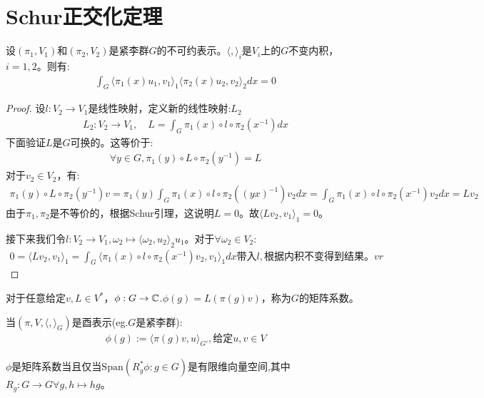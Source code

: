 \section{Schur正交化定理}
\begin{theorem}
    设$(\pi_1,V_1)$和$(\pi_2,V_2)$是紧李群$G$的不可约表示。$\langle,\rangle_i$是$V_i$上的$G$不变内积，$i=1,2$。则有:
    \begin{align*}
        \int_G \langle \pi_1(x)u_1,v_1\rangle_1\langle \pi_2(x)u_2,v_2\rangle_2 dx=0
    \end{align*}
\end{theorem}
\begin{proof}
    设$l:V_2 \to V_1$是线性映射，定义新的线性映射:$L_2$
    \begin{align*}
        L_2:V_2 \to V_1,\quad L=\int_G \pi_1(x)\circ l \circ \pi_2(x^{-1})dx
    \end{align*}
    下面验证$L$是$G$可换的。这等价于:
    \begin{align*}
        \forall y\in G,\pi_1(y)\circ L \circ \pi_2(y^{-1})=L
    \end{align*}
    对于$v_2 \in V_2$，有:
    \begin{align*}
        \pi_1(y) \circ L \circ \pi_2(y^{-1})v=\pi_1(y)\int_G \pi_1(x) \circ l \circ \pi_2((yx)^{-1})v_2 dx=\int_G \pi_1(x) \circ l\circ \pi_2(x^{-1})v_2dx=Lv_2
    \end{align*}
    由于$\pi_1,\pi_2$是不等价的，根据Schur引理，这说明$L=0$。故$\langle Lv_2,v_1\rangle_1=0$。

    接下来我们令$l:V_2 \to V_1, \omega_2 \mapsto \langle \omega_2,u_2\rangle_2 u_1$。对于$\forall \omega_2 \in V_2$:
    \begin{align*}
        0=\langle Lv_2,v_1\rangle_1=\int_G \langle \pi_1(x)\circ l\circ \pi_2(x^{-1})v_2,v_1 \rangle_1 dx \text{带入}l,\text{根据内积不变得到结果。} vr
    \end{align*}
\end{proof}
\begin{definition}
    对于任意给定$v,L \in V^*$，$\phi:G \to \mathbb{C}$.$\phi(g)=L(\pi(g)v)$，称为$G$的矩阵系数。
\end{definition}
\begin{remark}
    当$(\pi,V,\langle,\rangle_G)$是酉表示(eg.$G$是紧李群):
    \begin{align*}
        \phi(g):=\langle \pi(g)v,u\rangle_{G'},\text{给定}u,v \in V
    \end{align*}
\end{remark}
\begin{theorem}
    $\phi$是矩阵系数当且仅当$\mathrm{Span}(R_g^*\phi:g \in G)$是有限维向量空间,其中$R_g: G \to G \forall g,h  \mapsto hg$。
\end{theorem}
